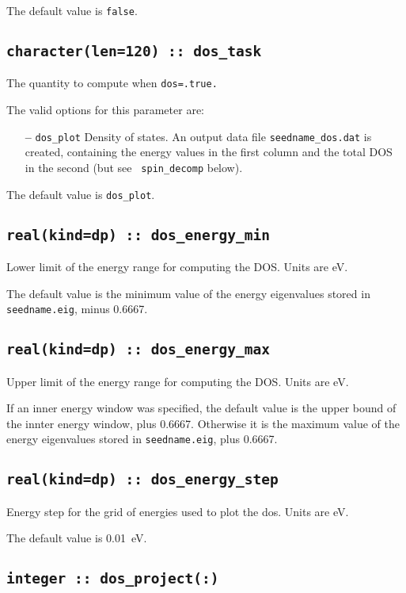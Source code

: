 The default value is \verb#false#.


\subsection[dos\_task]{\tt character(len=120) ::  dos\_task}
The quantity to compute when {\tt dos=.true.}

The valid options for this parameter are:
\begin{itemize}
\item[{\bf --}] \verb#dos_plot# Density of states. An output data file
  {\tt seedname\_dos.dat} is created, containing the energy values in
  the first column and the total DOS in the second (but see {\tt
    spin\_decomp} below).
\end{itemize}


The default value is \verb#dos_plot#.


\subsection[dos\_min\_energy]{\tt real(kind=dp) :: dos\_energy\_min}
Lower limit of the energy range for computing the DOS.
Units are eV.

The default value is the minimum value of the energy eigenvalues
stored in {\tt seedname.eig}, minus 0.6667.

\subsection[dos\_max\_energy]{\tt real(kind=dp) :: dos\_energy\_max}
Upper limit of the energy range for computing the DOS.
Units are eV.

If an inner energy window was specified, 
the default value is the upper bound of the innter energy window, plus 0.6667.
Otherwise it is  the maximum value of the energy eigenvalues
stored in {\tt seedname.eig}, plus 0.6667.

\subsection[dos\_energy\_step]{\tt real(kind=dp) :: dos\_energy\_step}
Energy step for the grid of energies used to plot the dos. Units are eV.

The default value is 0.01~eV.

\subsection[dos\_project]{\tt integer :: dos\_project(:)}


